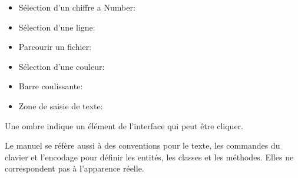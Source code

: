 \begin{itemize}
%
\item S\'election d'un chiffre a Number: 
%
\item S\'election d'une ligne: 
%
%
\item Parcourir un fichier: \browsebutton 
%
\item S\'election d'une couleur: 
%
\item Barre coulissante: 
%
\item Zone de saisie de texte: 
\end{itemize}
Une ombre indique un \'el\'ement de l'interface qui peut \^etre cliquer.

% 


Le manuel se r\'ef\`ere aussi \`a des conventions pour le texte, les commandes du clavier et l'encodage pour d\'efinir les entit\'es, les classes et les m\'ethodes. Elles ne correspondent pas \`a l'apparence r\'eelle.


